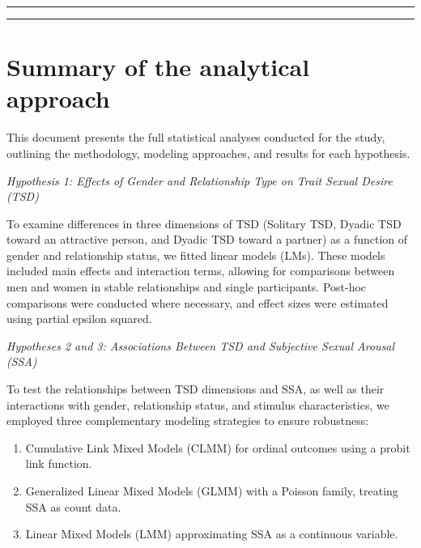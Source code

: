 \documentclass[
  bookmarksnumbered]{article}
\providecommand{\tightlist}{%
  \setlength{\itemsep}{0pt}\setlength{\parskip}{0pt}}
\begin{document}
\begin{center}\rule{0.5\linewidth}{0.5pt}\end{center}

\par
\endgroup

{\hypersetup{hidelinks}
\setcounter{tocdepth}{6}
\tableofcontents
}
\opensupplement

\begin{center}\rule{0.5\linewidth}{0.5pt}\end{center}

\section{Summary of the analytical approach}\label{summary-of-the-analytical-approach}

This document presents the full statistical analyses conducted for the study, outlining the methodology, modeling approaches, and results for each hypothesis.

\emph{Hypothesis 1: Effects of Gender and Relationship Type on Trait Sexual Desire (TSD)}

To examine differences in three dimensions of TSD (Solitary TSD, Dyadic TSD toward an attractive person, and Dyadic TSD toward a partner) as a function of gender and relationship status, we fitted linear models (LMs). These models included main effects and interaction terms, allowing for comparisons between men and women in stable relationships and single participants. Post-hoc comparisons were conducted where necessary, and effect sizes were estimated using partial epsilon squared.

\emph{Hypotheses 2 and 3: Associations Between TSD and Subjective Sexual Arousal (SSA)}

To test the relationships between TSD dimensions and SSA, as well as their interactions with gender, relationship status, and stimulus characteristics, we employed three complementary modeling strategies to ensure robustness:

\begin{enumerate}
\def\labelenumi{\arabic{enumi}.}
\tightlist
\item
  Cumulative Link Mixed Models (CLMM) for ordinal outcomes using a probit link function.
\item
  Generalized Linear Mixed Models (GLMM) with a Poisson family, treating SSA as count data.
\item
  Linear Mixed Models (LMM) approximating SSA as a continuous variable.
\end{enumerate}
\end{document}
